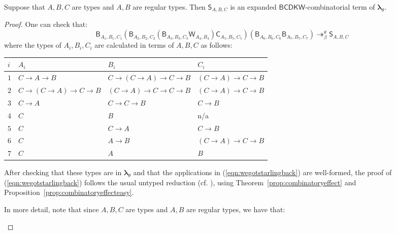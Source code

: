 \documentclass{lmcs} %
\newcommand{\param}{\theta}
\newcommand{\mltup}{\boldsymbol\lambda_{\param}}
\newcommand{\transreduces}[2]{\twoheadrightarrow_{#1}^{#2}}
\newcommand{\ctS}[6]{{\mathsf S}_{#1, #2, #3}#4#5#6}
\newcommand{\ctC}[6]{{\mathsf C}_{#1, #2, #3}#4#5#6}
\newcommand{\ctW}[4]{{\mathsf W}_{#1, #2}#3#4}
\newcommand{\ctB}[6]{{\mathsf B}_{#1, #2, #3}#4#5#6}
\begin{document}
\begin{prop}\label{prop:wegotstarlingback}
Suppose that $A,B,C$ are types and $A,B$ are regular types. Then $\ctS{A}{B}{C}{}{}{}$ is an expanded $\mathsf{BCDKW}$-combinatorial term of $\mltup$.
\end{prop}
\begin{proof}
One can check that:
\begin{equation}\label{eqn:wegotstarlingback}
\ctB{A_1}{B_1}{C_1}{}{}{} (\ctB{A_2}{B_2}{C_2}{}{}{} (\ctB{A_3}{B_3}{C_3}{}{}{} \ctW{A_4}{B_4}{}{}) \ctC{A_5}{B_5}{C_5}{}{}{}) (\ctB{A_6}{B_6}{C_6}{}{}{} \ctB{A_7}{B_7}{C_7}{}{}{}) \transreduces{\beta}{\param} \ctS{A}{B}{C}{}{}{}
\end{equation}
where the types of $A_i, B_i, C_i$ are calculated in terms of $A,B,C$ as follows:
\begin{center}
\begin{tabular}{|l|l|l|l|}
\hline
$i$ & $A_i$ & $B_i$ & $C_i$  \\ \hline
 $1$ & $C\rightarrow A\rightarrow B$ & $C\rightarrow (C\rightarrow A)\rightarrow C\rightarrow B$ & $(C\rightarrow A)\rightarrow C\rightarrow B$  \\ \hline
 $2$ & $C\rightarrow (C\rightarrow A)\rightarrow C\rightarrow B$ & $(C\rightarrow A)\rightarrow C\rightarrow C\rightarrow B$ &  $(C\rightarrow A)\rightarrow C\rightarrow B$  \\ \hline
 $3$ & $C\rightarrow A$ & $C\rightarrow C\rightarrow B$ & $C\rightarrow B$  \\ \hline
 $4$ & $C$ & $B$ & n/a  \\ \hline
 $5$ & $C$ & $C\rightarrow A$ & $C\rightarrow B$  \\ \hline
 $6$ & $C$ & $A\rightarrow B$ & $(C\rightarrow A)\rightarrow C\rightarrow B$  \\ \hline
 $7$ & $C$ & $A$ & $B$  \\ \hline
\end{tabular}
\end{center}
After checking that these types are in $\mltup$ and that the applications in (\ref{eqn:wegotstarlingback}) are well-formed, the proof of (\ref{eqn:wegotstarlingback}) follows the usual untyped reduction (cf. \cite[p. 155]{Curry1958-yi}), using Theorem~\ref{prop:combinatoryeffect} and Proposition~\ref{prop:combinatoryeffecteasy}.
\begin{proofdetail}
In more detail, note that since $A,B,C$ are types and $A,B$ are regular types, we have that:
\begin{itemize}[leftmargin=*]

\end{itemize}
\end{proofdetail}
\end{proof}
\end{document}

